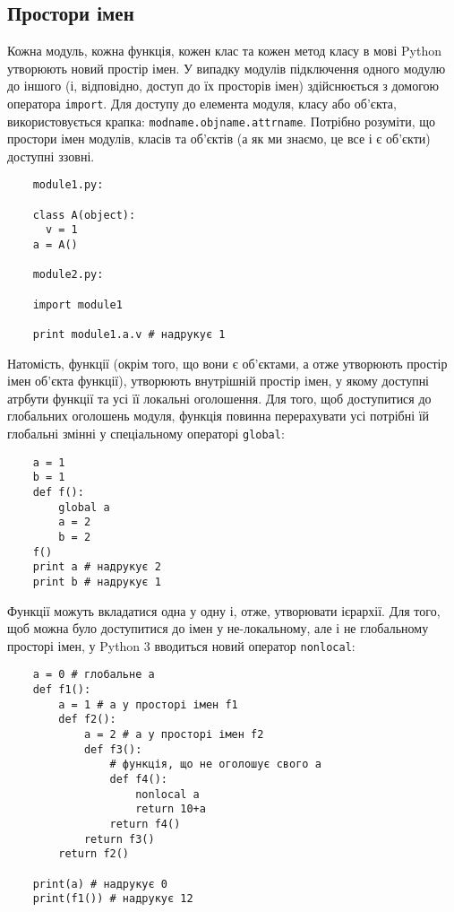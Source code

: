\documentclass[a4paper, 12pt, onsedie]{article}
\begin{document}
\subsection{Простори імен}
    Кожна модуль, кожна функція, кожен клас та кожен метод класу в мові Python утворюють 
    новий простір імен. У випадку модулів підключення одного модулю до іншого (і, відповідно,
    доступ до їх просторів імен) здійснюється з домогою оператора \texttt{import}. Для доступу
    до елемента модуля, класу або об'єкта, використовується крапка: 
    \texttt{modname.objname.attrname}. Потрібно розуміти, що простори імен модулів, класів та
    об'єктів (а як ми знаємо, це все і є об'єкти) доступні ззовні.
    \begin{verbatim}
    module1.py:

    class A(object):
      v = 1
    a = A()

    module2.py:

    import module1

    print module1.a.v # надрукує 1
    \end{verbatim}
    Натомість, функції (окрім того, що вони є об'єктами, а отже утворюють простір імен об'єкта
    функції), утворюють внутрішній простір імен, у якому доступні атрбути функції та усі її
    локальні оголошення. Для того, щоб доступитися до глобальних оголошень модуля, функція повинна
    перерахувати усі потрібні їй глобальні змінні у спеціальному операторі \texttt{global}:
    \begin{verbatim}
    a = 1
    b = 1
    def f():
        global a
        a = 2
        b = 2
    f()
    print a # надрукує 2
    print b # надрукує 1
    \end{verbatim}

    Функції можуть вкладатися одна у одну і, отже, утворювати ієрархії. Для того, щоб можна було
    доступитися до імен у не-локальному, але і не глобальному просторі імен, у Python 3 вводиться
    новий оператор \texttt{nonlocal}:
    \begin{verbatim}
    a = 0 # глобальне a
    def f1():
        a = 1 # a у просторі імен f1
        def f2():
            a = 2 # a у просторі імен f2
            def f3():
                # функція, що не оголошує свого a
                def f4():
                    nonlocal a
                    return 10+a
                return f4()
            return f3()
        return f2()

    print(a) # надрукує 0
    print(f1()) # надрукує 12
    \end{verbatim}
\end{document}
